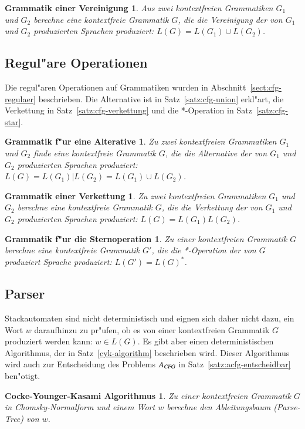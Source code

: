 \newtheorem*{CfgUnion}{Grammatik einer Vereinigung}
\begin{CfgUnion}
Aus zwei kontextfreien Grammatiken $G_1$ und $G_2$ berechne
eine kontextfreie Grammatik $G$, die die
Vereinigung der von $G_1$ und $G_2$ produzierten Sprachen produziert:
$L(G)=L(G_1)\cup L(G_2)$.
\end{CfgUnion}

\subsection{Regul"are Operationen}
Die regul"aren Operationen auf Grammatiken wurden in
Abschnitt~\ref{sect:cfg-regulaer} beschrieben.
Die Alternative ist in Satz~\ref{satz:cfg-union} erkl"art,
die Verkettung in Satz~\ref{satz:cfg-verkettung} und die *-Operation
in Satz~\ref{satz:cfg-star}.

\newtheorem*{CfgAlternative}{Grammatik f"ur eine Alterative}
\begin{CfgAlternative}
Zu zwei kontextfreien Grammatiken $G_1$ und $G_2$ finde eine
kontextfreie Grammatik $G$, die die
Alternative der von $G_1$ und $G_2$ produzierten Sprachen produziert:
$L(G)=L(G_1)|L(G_2)=L(G_1)\cup L(G_2)$.
\end{CfgAlternative}

\newtheorem*{CfgConcatenation}{Grammatik einer Verkettung}
\begin{CfgConcatenation}
Zu zwei kontextfreien Grammatiken $G_1$ und $G_2$ berechne eine 
kontextfreie Grammatik $G$, die die Verkettung der von $G_1$ und $G_2$
produzierten Sprachen produziert: $L(G)=L(G_1)L(G_2)$.
\end{CfgConcatenation}

\newtheorem*{CfgStar}{Grammatik f"ur die Sternoperation}
\begin{CfgStar}
Zu einer kontextfreien Grammatik $G$ berechne eine kontextfreie Grammatik
$G'$, die die *-Operation der von $G$ produziert Sprache produziert:
$L(G')=L(G)^*$.
\end{CfgStar}

\subsection{Parser}
Stackautomaten sind nicht deterministisch und eignen sich daher nicht
dazu, ein Wort $w$ daraufhinzu zu pr"ufen, ob es von einer kontextfreien
Grammatik $G$ produziert werden kann: $w\in L(G)$. 
Es gibt aber einen deterministischen Algorithmus, der in
Satz~\ref{cyk-algorithm} beschrieben wird.
Dieser Algorithmus wird auch zur Entscheidung des Problems $A_\textsl{CFG}$
in Satz~\ref{satz:acfg-entscheidbar}
ben"otigt.

\newtheorem*{CYK}{Cocke-Younger-Kasami Algorithmus}
\begin{CYK}
Zu einer kontextfreien Grammatik $G$ in Chomsky-Normalform und einem
Wort $w$ berechne den Ableitungsbaum (Parse-Tree) von $w$.
\end{CYK}



